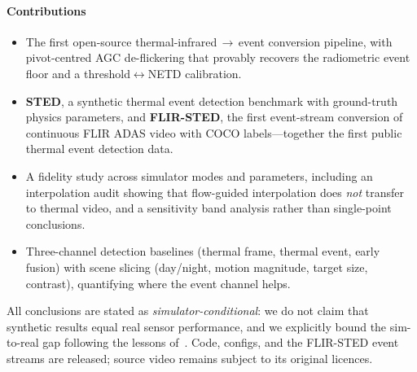 \paragraph{Contributions}
\begin{itemize}
  \item[\textbf{C1}] The first open-source thermal-infrared\,$\to$\,event
  conversion pipeline, with pivot-centred AGC de-flickering that provably
  recovers the radiometric event floor and a
  threshold$\leftrightarrow$NETD calibration.
  \item[\textbf{C2}] \textbf{STED}, a synthetic thermal event detection
  benchmark with ground-truth physics parameters, and \textbf{FLIR-STED},
  the first event-stream conversion of continuous FLIR ADAS video with
  COCO labels---together the first public thermal event detection data.
  \item[\textbf{C3}] A fidelity study across simulator modes and
  parameters, including an interpolation audit showing that flow-guided
  interpolation does \emph{not} transfer to thermal video, and a
  sensitivity band analysis rather than single-point conclusions.
  \item[\textbf{C4}] Three-channel detection baselines (thermal frame,
  thermal event, early fusion) with scene slicing (day/night, motion
  magnitude, target size, contrast), quantifying where the event channel
  helps.
\end{itemize}

All conclusions are stated as \emph{simulator-conditional}: we do not claim
that synthetic results equal real sensor performance, and we explicitly
bound the sim-to-real gap following the lessons
of~\cite{stoffregen2020sim2real}. Code, configs, and the FLIR-STED event
streams are released; source video remains subject to its original licences.
